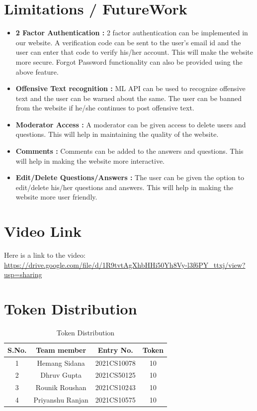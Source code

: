 \documentclass{article}
\begin{document}
\section{Limitations / FutureWork}
\begin{itemize}
    \item \textbf{2 Factor Authentication :} 2 factor authentication can be implemented in our website. A verification code can be sent to the user's email id and the user can enter that code to verify his/her account. This will make the website more secure. Forgot Password functionality can also be provided using the above feature.
    \item \textbf{Offensive Text recognition :} ML API can be used to recognize offensive text and the user can be warned about the same. The user can be banned from the website if he/she continues to post offensive text.
    \item \textbf{Moderator Access :} A moderator can be given access to delete users and questions. This will help in maintaining the quality of the website.
    \item \textbf{Comments :} Comments can be added to the answers and questions. This will help in making the website more interactive.
    \item \textbf{Edit/Delete Questions/Answers :} The user can be given the option to edit/delete his/her questions and answers. This will help in making the website more user friendly.
\end{itemize}
\section{Video Link}
Here is a link to the video: \url{https://drive.google.com/file/d/1R9tvtAgXhbHHi50Yh8Vy-l3f6PY_ttxj/view?usp=sharing}
\section{Token Distribution}

\begin{table}[h]
    \centering
    \begin{tabular}{|c|c|c|c|}
    \hline
    \textbf{S.No.} & \textbf{Team member} & \textbf{Entry No.} & \textbf{Token} \\ \hline
    1              & Hemang Sidana        & 2021CS10078        & 10             \\ \hline
    2              & Dhruv Gupta          & 2021CS50125        & 10             \\ \hline
    3              & Rounik Roushan       & 2021CS10243        & 10             \\ \hline
    4              & Priyanshu Ranjan     & 2021CS10575        & 10             \\ \hline
    \end{tabular}
    \caption{Token Distribution}
    \label{tab:token-split}
    \end{table}
\end{document}
